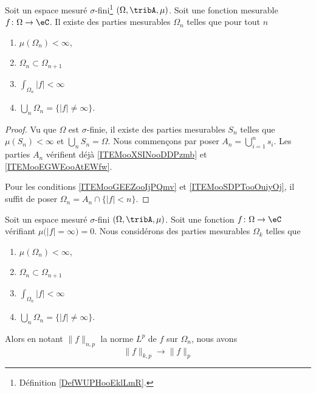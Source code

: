 \begin{proposition}	\label{PROPooRSDBooHEjQDq}
	Soit un espace mesuré \( \sigma\)-fini\footnote{Définition \ref{DefWUPHooEklLmR}.} \( (\Omega,\tribA, \mu)\). Soit une fonction mesurable \(f \colon \Omega\to \eC  \). Il existe des parties mesurables \( \Omega_n\) telles que pour tout \( n\)
	\begin{enumerate}
		\item		\label{ITEMooXSINooDDPzmb}
		      \( \mu(\Omega_n)<\infty\),
		\item		\label{ITEMooEGWEooAtEWfw}
		      \( \Omega_n\subset \Omega_{n+1}\)
		\item		\label{ITEMooGEEZooIjPQmv}
		      \( \int_{\Omega_n}| f |<\infty\)
		\item		\label{ITEMooSDPTooOuiyOj}
		      \( \bigcup_n\Omega_n= \{ | f |\neq \infty \}\).
	\end{enumerate}
\end{proposition}

\begin{proof}
	Vu que \( \Omega\) est \( \sigma\)-finie, il existe des parties mesurables \( S_n\) telles que \( \mu(S_n)<\infty\) et \( \bigcup_nS_n=\Omega\). Nous commençons par poser \( A_n=\bigcup_{i=1}^ns_i\). Les parties \( A_n\) vérifient déjà \ref{ITEMooXSINooDDPzmb} et \ref{ITEMooEGWEooAtEWfw}.

	Pour les conditions \ref{ITEMooGEEZooIjPQmv} et \ref{ITEMooSDPTooOuiyOj}, il suffit de poser \( \Omega_n=A_n\cap\{ | f |<n \}\).
\end{proof}


\begin{proposition}	\label{PROPooQNNVooTKRdyC}
	Soit un espace mesuré \( \sigma\)-fini \( (\Omega,\tribA,\mu)\). Soit une fonction \(f \colon \Omega\to \eC  \) vérifiant \( \mu\big( | f |=\infty \big)=0\). Nous considérons des parties mesurables \( \Omega_k\) telles que
	\begin{enumerate}
		\item
		      \( \mu(\Omega_n)<\infty\),
		\item
		      \( \Omega_n\subset \Omega_{n+1}\)
		\item
		      \( \int_{\Omega_n}| f |<\infty\)
		\item
		      \( \bigcup_n\Omega_n= \{ | f |\neq \infty \}\).
	\end{enumerate}
	Alors en notant \( \| f \|_{n,p}\) la norme \( L^p\) de \( f\) sur \( \Omega_n\), nous avons
	\begin{equation}
		\| f \|_{k,p}\to \| f \|_p
	\end{equation}
\end{proposition}


